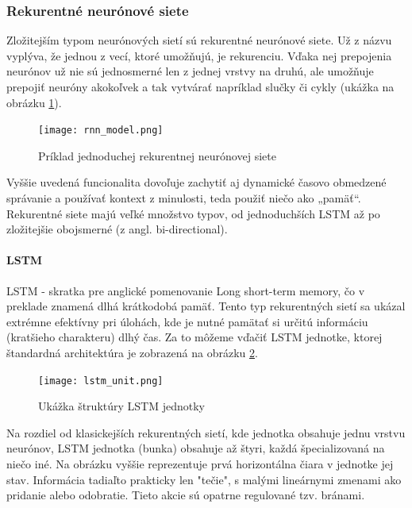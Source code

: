 \subsubsection{Rekurentné neurónové siete}
Zložitejším typom  neurónových sietí sú rekurentné neurónové siete. Už z názvu vyplýva, že jednou z vecí, ktoré umožňujú, je rekurenciu. Vďaka nej prepojenia neurónov už nie sú jednosmerné len z jednej vrstvy na druhú, ale umožňuje prepojiť neuróny akokoľvek a tak vytvárať napríklad slučky či cykly (ukážka na obrázku \ref{rnn_image}).

\begin{figure}[H]
	\begin{center}\texttt{[image: rnn\_model.png]}\end{center}
	\caption[Jednoduchá rekurentná neurónová sieť]{Príklad jednoduchej rekurentnej neurónovej siete\label{rnn_image}\footnotemark}
	
\end{figure}

Vyššie uvedená funcionalita dovoľuje zachytiť aj dynamické časovo obmedzené správanie a používať kontext z minulosti, teda použiť niečo ako „pamäť“. Rekurentné siete majú veľké množstvo typov, od jednoduchších LSTM až po zložitejšie obojsmerné (z angl. bi-directional).

\paragraph{LSTM} 
LSTM\cite{gers1999learning} - skratka pre anglické pomenovanie Long short-term memory, čo v preklade znamená dlhá krátkodobá pamäť. Tento typ rekurentných sietí sa ukázal extrémne efektívny pri úlohách, kde je nutné pamätať si určitú informáciu (kratšieho charakteru) dlhý čas. Za to môžeme vďačiť LSTM jednotke, ktorej štandardná architektúra je zobrazená na obrázku \ref{lstm_unit_image}.

\begin{figure}[H]
	\begin{center}\texttt{[image: lstm\_unit.png]}\end{center}
	\caption[Zobrazenie LSTM jednotky]{Ukážka štruktúry LSTM jednotky\label{lstm_unit_image}\footnotemark}
	
\end{figure}

Na rozdiel od klasickejších rekurentných sietí, kde jednotka obsahuje jednu vrstvu neurónov, LSTM jednotka (bunka) obsahuje až štyri, každá špecializovaná na niečo iné. Na obrázku vyššie reprezentuje prvá horizontálna čiara v jednotke jej stav. Informácia tadiaľto prakticky len "tečie", s malými lineárnymi zmenami ako pridanie alebo odobratie. Tieto akcie sú opatrne regulované tzv. bránami.

